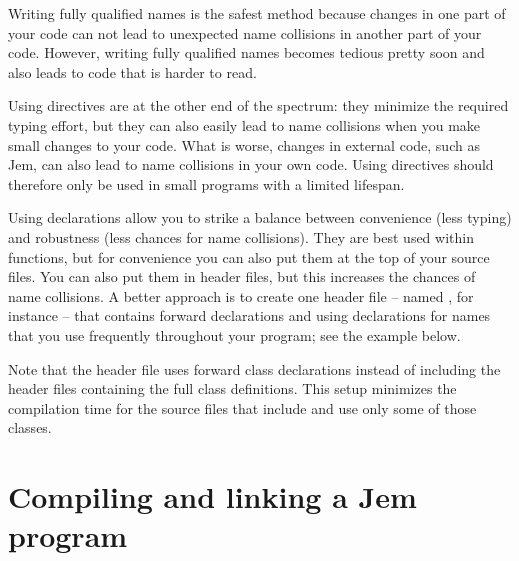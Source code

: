 \documentclass[a4paper,10pt]{article}
\begin{document}
Writing fully qualified names is the safest method because changes in one
part of your code can not lead to unexpected name collisions in another
part of your code. However, writing fully qualified names becomes tedious
pretty soon and also leads to code that is harder to read.

Using directives are at the other end of the spectrum: they minimize the
required typing effort, but they can also easily lead to name collisions
when you make small changes to your code. What is worse, changes in
external code, such as Jem, can also lead to name collisions in your own
code. Using directives should therefore only be used in small programs
with a limited lifespan.

Using declarations allow you to strike a balance between convenience
(less typing) and robustness (less chances for name collisions). They are
best used within functions, but for convenience you can also put them at
the top of your source files. You can also put them in header files, but
this increases the chances of name collisions. A better approach is to
create one header file -- named , for instance -- that
contains forward declarations and using declarations for names that you
use frequently throughout your program; see the example below.


Note that the header file  uses forward class declarations
instead of including the header files containing the full class
definitions. This setup minimizes the compilation time for the source
files that include  and use only some of those
classes.


\section{Compiling and linking a Jem program
  \label{section:compiling-and-linking}}
\end{document}
